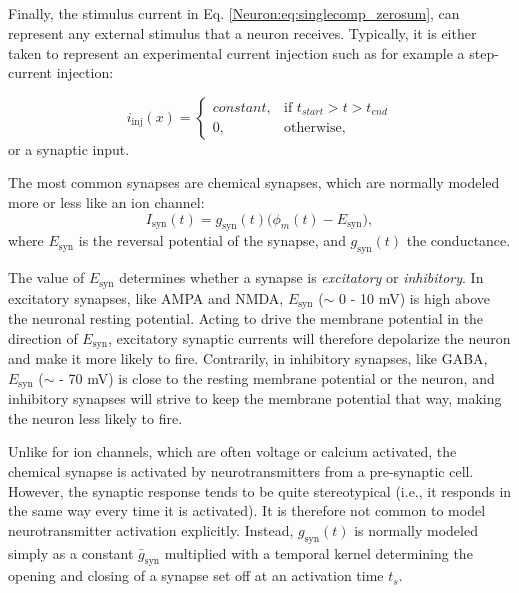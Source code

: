 \subsection{}
\label{sec:Neuron:stim}
Finally, the stimulus current in Eq. \ref{Neuron:eq:singlecomp_zerosum}, can represent any external stimulus that a neuron receives. Typically, it is either taken to represent an experimental current injection such as for example a step-current injection:

\begin{equation}
i_\text{inj}(x)= 
\begin{cases}
    constant, & \text{if } t_{start} > t > t_{end} \\
    0,              & \text{otherwise},
\end{cases}
\label{Neuron:eq:injected}
\end{equation}
or a synaptic input. 

The most common synapses are chemical synapses, which are normally modeled more or less like an ion channel:
\begin{equation}
I_\text{syn}(t) = g_\text{syn}(t) \big( \phi_m(t)-E_\text{syn} \big), 
\label{Neuron:eq:chemicalsynapse}
\end{equation}
where $E_\text{syn}$ is the reversal potential of the synapse, and $g_\text{syn}(t)$ the conductance. 

The value of $E_\text{syn}$ determines whether a synapse is \textit{excitatory} or \textit{inhibitory}. In excitatory synapses, like 
AMPA and NMDA, $E_\text{syn}$ ($\sim$ 0 - 10 mV) is high above the neuronal resting potential. Acting to drive the membrane potential in the direction of $E_\text{syn}$, excitatory synaptic currents will therefore depolarize the neuron and make it more likely to fire. Contrarily, in inhibitory synapses, like GABA, $E_\text{syn}$ ($\sim$ - 70 mV) is close to the resting membrane potential or the neuron, and inhibitory synapses will strive to keep the membrane potential that way, making the neuron less likely to fire.

Unlike for ion channels, which are often voltage or calcium activated, the chemical synapse is activated by neurotransmitters from a pre-synaptic cell. However, the synaptic response tends to be quite stereotypical (i.e., it responds in the same way every time it is activated). It is therefore not common to model neurotransmitter activation explicitly. Instead, $g_\text{syn}(t)$ is normally modeled simply as a constant $\bar{g}_\text{syn}$ multiplied with a temporal kernel determining the opening and closing of a synapse set off at an activation time $t_s$. 

